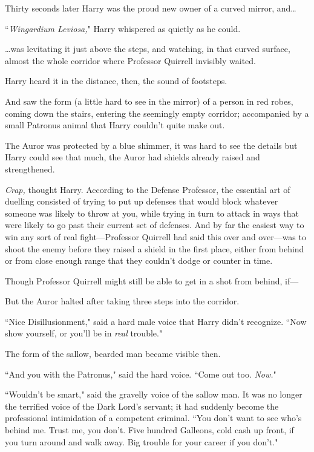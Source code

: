 Thirty seconds later Harry was the proud new owner of a curved mirror, and{\ldots}

``\emph{Wingardium Leviosa,}" Harry whispered as quietly as he could.

{\ldots}was levitating it just above the steps, and watching, in that curved surface, almost the whole corridor where Professor Quirrell invisibly waited.

Harry heard it in the distance, then, the sound of footsteps.

And saw the form (a little hard to see in the mirror) of a person in red robes, coming down the stairs, entering the seemingly empty corridor; accompanied by a small Patronus animal that Harry couldn't quite make out.

The Auror was protected by a blue shimmer, it was hard to see the details but Harry could see that much, the Auror had shields already raised and strengthened.

\emph{Crap,} thought Harry. According to the Defense Professor, the essential art of duelling consisted of trying to put up defenses that would block whatever someone was likely to throw at you, while trying in turn to attack in ways that were likely to go past their current set of defenses. And by far the easiest way to win any sort of real fight—Professor Quirrell had said this over and over—was to shoot the enemy before they raised a shield in the first place, either from behind or from close enough range that they couldn't dodge or counter in time.

Though Professor Quirrell might still be able to get in a shot from behind, if—

But the Auror halted after taking three steps into the corridor.

``Nice Disillusionment," said a hard male voice that Harry didn't recognize. ``Now show yourself, or you'll be in \emph{real} trouble."

The form of the sallow, bearded man became visible then.

``And you with the Patronus," said the hard voice. ``Come out too. \emph{Now.}"

``Wouldn't be smart," said the gravelly voice of the sallow man. It was no longer the terrified voice of the Dark Lord's servant; it had suddenly become the professional intimidation of a competent criminal. ``You don't want to see who's behind me. Trust me, you don't. Five hundred Galleons, cold cash up front, if you turn around and walk away. Big trouble for your career if you don't."

